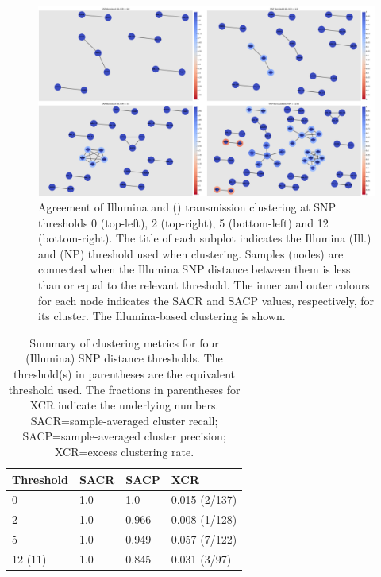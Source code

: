 \begin{figure}
\begin{center}
\includegraphics[width=0.90\columnwidth]{Chapter2/Figs/bcftools_clusters.png}
\caption{{Agreement of Illumina and \bcftools{} (\ont{}) transmission clustering at SNP thresholds 0 (top-left), 2 (top-right), 5 (bottom-left) and 12 (bottom-right). The title of each subplot indicates the Illumina (Ill.) and \ont{} (NP) threshold used when clustering. Samples (nodes) are connected when the Illumina SNP distance between them is less than or equal to the relevant threshold. The inner and outer colours for each node indicates the SACR and SACP values, respectively, for its cluster. The Illumina-based clustering is shown.
{\label{fig:bcftools-clusters}}
}}
\end{center}
\end{figure}

\begin{table}
\centering
\begin{tabular}{@{}llll@{}}
\toprule
Threshold & SACR & SACP  & XCR           \\ \midrule
0         & 1.0  & 1.0   & 0.015 (2/137) \\
2         & 1.0  & 0.966 & 0.008 (1/128) \\
5         & 1.0  & 0.949 & 0.057 (7/122) \\
12 (11)   & 1.0  & 0.845 & 0.031 (3/97)  \\ \bottomrule
\end{tabular}
\caption{Summary of \bcftools{} clustering metrics for four (Illumina) SNP distance thresholds. The threshold(s) in parentheses are the \ont{} equivalent threshold used. The fractions in parentheses for XCR indicate the underlying numbers. SACR=sample-averaged cluster recall; SACP=sample-averaged cluster precision; XCR=excess clustering rate.}
\label{tab:bcftools-cluster-summary}
\end{table}

